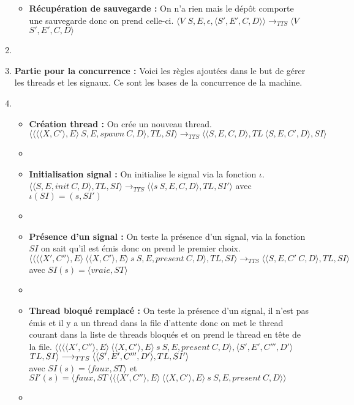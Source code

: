 \documentclass[10pt,a4paper]{report}
\begin{document}
\begin{enumerate}
\begin{itemize}
			\item[] \textbf{Récupération de sauvegarde :}  On n'a rien mais le dépôt comporte une sauvegarde donc on prend celle-ci.
			\smallbreak  
			$\langle V$ $S,E,\epsilon,\langle S',E',C,D\rangle\rangle
			\longrightarrow_{TTS} 
			\langle V$ $S',E',C,D\rangle$
		\end{itemize}
		\item[]
		
		
		
		\item[] \textbf{Partie pour la concurrence :} Voici les règles ajoutées dans le but de gérer les threads et les signaux. Ce sont les bases de la concurrence de la machine. 
		\item[]
		\begin{itemize}
			\item[]  \textbf{Création thread :} On crée un nouveau thread.
			\smallbreak 
			$\langle\langle\langle\langle X,C'\rangle, E\rangle~S,E,spawn~C,D\rangle,TL,SI\rangle 
			\longrightarrow_{TTS} 
			\langle\langle S,E,C,D\rangle,TL~\langle S,E,C',D\rangle,SI\rangle$
			\item[]
			
			\item[] \textbf{Initialisation signal :} On initialise le signal via la fonction $\iota$.
			\smallbreak 
			$\langle\langle S,E,init~C,D\rangle,TL,SI\rangle 
			\longrightarrow_{TTS}
			\langle\langle s~S,E,C,D\rangle,TL,SI'\rangle$
			avec $\iota(SI) = (s,SI')$
			\item[]	
			
			\item[] \textbf{Présence d'un signal :} On teste la présence d'un signal, via la fonction $SI$ on sait qu'il est émis donc on prend le premier choix.
			\smallbreak
			$\langle\langle \langle\langle X',C''\rangle,E\rangle~\langle\langle X,C'\rangle,E\rangle~s~S,E,present~C,D\rangle,TL,SI\rangle 
			\longrightarrow_{TTS} 
			\langle\langle S,E,C'~C,D\rangle,TL,SI\rangle$ 
			\\avec $SI(s) = \langle vraie,ST\rangle$
			\item[]
			
			
			\item[] \textbf{ Thread bloqué remplacé :} On teste la présence d'un signal, il n'est pas émis et il y a un thread dans la file d'attente donc on met le thread courant dans la liste de threads bloqués et on prend le thread en tête de la file.
			\smallbreak
			$\langle\langle \langle\langle X',C''\rangle,E\rangle~\langle\langle X,C'\rangle,E\rangle~s~S,E,present~C,D\rangle,\langle S',E',C''',D'\rangle$ $TL,SI\rangle 
			\\\longrightarrow_{TTS} 
			\langle\langle S',E',C''',D'\rangle,TL,SI'\rangle$ 
			\\avec $SI(s) = \langle faux,ST\rangle$
			et $SI'(s) = \langle faux,ST~\langle \langle\langle X',C''\rangle,E\rangle~\langle\langle X,C'\rangle,E\rangle~s~S,E,present~C,D\rangle\rangle$
			\item[]	
			

\end{itemize}
\end{enumerate}
\end{document}

